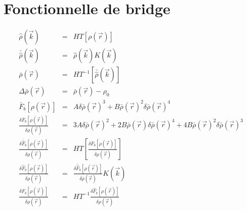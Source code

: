 \section{Fonctionnelle de bridge}
\label{sec:annexes:grad:bridge}
\begin{eqnarray}
\hat{\rho}(\vec{k})&=&HT[\rho(\vec{r})]  \\
\bar{\hat{\rho}}(\vec{k})&=&\hat{\rho}(\vec{k})K(\vec{k})   \\
\bar{\rho}(\vec{r})&=&HT^{-1}[\bar{\hat{\rho}}(\vec{k})]  \\
\Delta\bar{\rho}(\vec{r})&=&\bar{\rho}(\vec{r})-\rho_{0}  \\
\bar{F}_{b}[\rho(\vec{r})]&=&A\delta\bar{\rho}(\vec{r})^{3}+B\bar{\rho}(\vec{r})^{2}\delta\bar{\rho}(\vec{r})^{4}  \\
\frac{\delta\bar{F}_{b}[\rho(\vec{r})]}{\delta\rho(\vec{r})}&=&3A\delta\bar{\rho}(\vec{r})^{2}+2B\bar{\rho}(\vec{r})\delta\bar{\rho}(\vec{r})^{4}+4B\bar{\rho}(\vec{r})^{2}\delta\bar{\rho}(\vec{r})^{3}  \\
\frac{\delta\bar{\hat{F}}_{b}[\rho(\vec{r})]}{\delta\rho(\vec{r})}&=&HT[\frac{\delta\bar{F}_{b}[\rho(\vec{r})]}{\delta\rho(\vec{r})}]  \\
\frac{\delta\hat{F}_{b}[\rho(\vec{r})]}{\delta\rho(\vec{r})}&=&\frac{\delta\bar{\hat{F}}_{b}[\rho(\vec{r})]}{\delta\bar{\rho}(\vec{r})}K(\vec{k})  \\
\frac{\delta F_{b}[\rho(\vec{r})]}{\delta\rho(\vec{r})}&=&HT^{-1}\frac{\delta\hat{F}_{b}[\rho(\vec{r})]}{\delta\rho(\vec{r})} 
\end{eqnarray}

%

%

